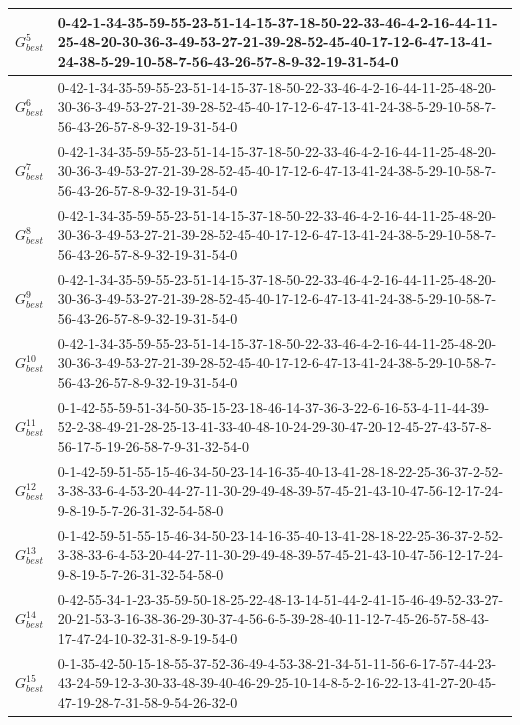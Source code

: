 \begin{landscape}
{\begin{tabularx}{\linewidth}{|c|X|}
        $G_{best}^{5}$   & 0-42-1-34-35-59-55-23-51-14-15-37-18-50-22-33-46-4-2-16-44-11-25-48-20-30-36-3-49-53-27-21-39-28-52-45-40-17-12-6-47-13-41-24-38-5-29-10-58-7-56-43-26-57-8-9-32-19-31-54-0 \\ \hline
        $G_{best}^{6}$   & 0-42-1-34-35-59-55-23-51-14-15-37-18-50-22-33-46-4-2-16-44-11-25-48-20-30-36-3-49-53-27-21-39-28-52-45-40-17-12-6-47-13-41-24-38-5-29-10-58-7-56-43-26-57-8-9-32-19-31-54-0 \\ \hline
        $G_{best}^{7}$   & 0-42-1-34-35-59-55-23-51-14-15-37-18-50-22-33-46-4-2-16-44-11-25-48-20-30-36-3-49-53-27-21-39-28-52-45-40-17-12-6-47-13-41-24-38-5-29-10-58-7-56-43-26-57-8-9-32-19-31-54-0 \\ \hline
        $G_{best}^{8}$   & 0-42-1-34-35-59-55-23-51-14-15-37-18-50-22-33-46-4-2-16-44-11-25-48-20-30-36-3-49-53-27-21-39-28-52-45-40-17-12-6-47-13-41-24-38-5-29-10-58-7-56-43-26-57-8-9-32-19-31-54-0 \\ \hline
        $G_{best}^{9}$   & 0-42-1-34-35-59-55-23-51-14-15-37-18-50-22-33-46-4-2-16-44-11-25-48-20-30-36-3-49-53-27-21-39-28-52-45-40-17-12-6-47-13-41-24-38-5-29-10-58-7-56-43-26-57-8-9-32-19-31-54-0 \\ \hline
        $G_{best}^{10}$  & 0-42-1-34-35-59-55-23-51-14-15-37-18-50-22-33-46-4-2-16-44-11-25-48-20-30-36-3-49-53-27-21-39-28-52-45-40-17-12-6-47-13-41-24-38-5-29-10-58-7-56-43-26-57-8-9-32-19-31-54-0 \\ \hline
        $G_{best}^{11}$  & 0-1-42-55-59-51-34-50-35-15-23-18-46-14-37-36-3-22-6-16-53-4-11-44-39-52-2-38-49-21-28-25-13-41-33-40-48-10-24-29-30-47-20-12-45-27-43-57-8-56-17-5-19-26-58-7-9-31-32-54-0 \\ \hline
        $G_{best}^{12}$  & 0-1-42-59-51-55-15-46-34-50-23-14-16-35-40-13-41-28-18-22-25-36-37-2-52-3-38-33-6-4-53-20-44-27-11-30-29-49-48-39-57-45-21-43-10-47-56-12-17-24-9-8-19-5-7-26-31-32-54-58-0 \\ \hline
        $G_{best}^{13}$  & 0-1-42-59-51-55-15-46-34-50-23-14-16-35-40-13-41-28-18-22-25-36-37-2-52-3-38-33-6-4-53-20-44-27-11-30-29-49-48-39-57-45-21-43-10-47-56-12-17-24-9-8-19-5-7-26-31-32-54-58-0 \\ \hline
        $G_{best}^{14}$  & 0-42-55-34-1-23-35-59-50-18-25-22-48-13-14-51-44-2-41-15-46-49-52-33-27-20-21-53-3-16-38-36-29-30-37-4-56-6-5-39-28-40-11-12-7-45-26-57-58-43-17-47-24-10-32-31-8-9-19-54-0 \\ \hline
        $G_{best}^{15}$  & 0-1-35-42-50-15-18-55-37-52-36-49-4-53-38-21-34-51-11-56-6-17-57-44-23-43-24-59-12-3-30-33-48-39-40-46-29-25-10-14-8-5-2-16-22-13-41-27-20-45-47-19-28-7-31-58-9-54-26-32-0 \\ \hline

\end{tabularx}}
\end{landscape}
